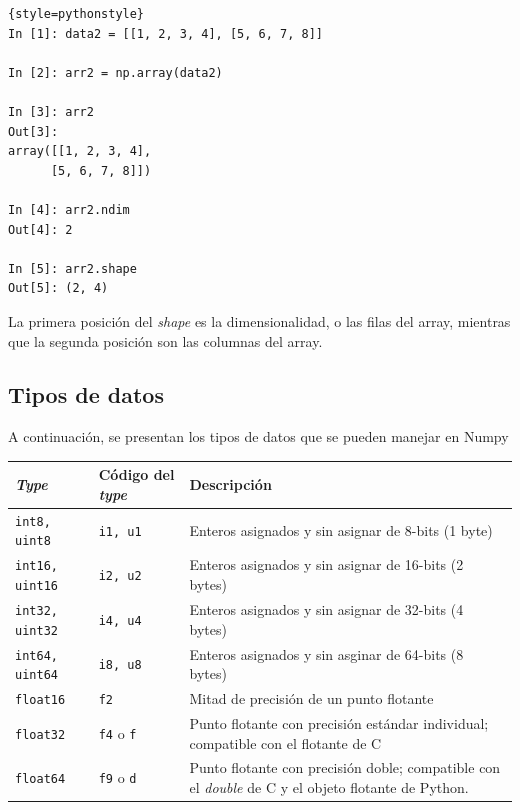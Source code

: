\documentclass{article}
\begin{document}
\begin{lstlisting}{style=pythonstyle}
In [1]: data2 = [[1, 2, 3, 4], [5, 6, 7, 8]]

In [2]: arr2 = np.array(data2)

In [3]: arr2
Out[3]:
array([[1, 2, 3, 4],
      [5, 6, 7, 8]])

In [4]: arr2.ndim
Out[4]: 2

In [5]: arr2.shape
Out[5]: (2, 4)
\end{lstlisting}

La primera posición del \textit{shape} es la dimensionalidad, o las filas del array, mientras que la segunda posición son las columnas del array.

\subsection{Tipos de datos}

A continuación, se presentan los tipos de datos que se pueden manejar en Numpy


\begin{longtable}{|C{0.25\textwidth}|C{0.25\textwidth}|C{0.4\textwidth}|}
  \hline
  \textbf{\textit{Type}} & \textbf{Código del \textit{type}} & \textbf{Descripción} \\ \hline
  \texttt{int8, uint8} & \texttt{i1, u1} & Enteros asignados y sin asignar de 8-bits (1 byte) \\ \hline
  \texttt{int16, uint16} & \texttt{i2, u2} & Enteros asignados y sin asignar de 16-bits (2 bytes) \\ \hline
  \texttt{int32, uint32} & \texttt{i4, u4} & Enteros asignados y sin asignar de 32-bits (4 bytes) \\ \hline
  \texttt{int64, uint64} & \texttt{i8, u8} & Enteros asignados y sin asginar de 64-bits (8 bytes) \\ \hline
  \texttt{float16} & \texttt{f2} & Mitad de precisión de un punto flotante \\ \hline
  \texttt{float32} & \texttt{f4} o \texttt{f} & Punto flotante con precisión estándar individual; compatible con el flotante de C \\ \hline
  \texttt{float64} & \texttt{f9} o \texttt{d} & Punto flotante con precisión doble; compatible con el \textit{double} de C y el objeto flotante de Python. \\ \hline
\end{longtable}
\end{document}
